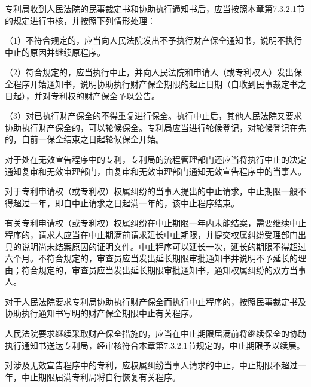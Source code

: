 专利局收到人民法院的民事裁定书和协助执行通知书后，应当按照本章第7.3.2.1节的规定进行审核，并按照下列情形处理：

{\setlength{\parindent}{17.1bp}（1）不符合规定的，应当向人民法院发出不予执行财产保全通知书，说明不执行中止的原因并继续原程序。\par}

{\setlength{\parindent}{17.1bp}（2）符合规定的，应当执行中止，并向人民法院和申请人（或专利权人）发出保全程序开始通知书，说明协助执行财产保全期限的起止日期（自收到民事裁定书之日起），并对专利权的财产保全予以公告。\par}

{\setlength{\parindent}{17.1bp}（3）对已执行财产保全的不得重复进行保全。执行中止后，其他人民法院又要求协助执行财产保全的，可以轮候保全。专利局应当进行轮候登记，对轮候登记在先的，自前一保全结束之日起轮候保全开始。\par}

对于处在无效宣告程序中的专利，专利局的流程管理部门还应当将执行中止的决定通知复审和无效审理部门，由复审和无效审理部门通知无效宣告程序中的当事人。

对于专利申请权（或专利权）权属纠纷的当事人提出的中止请求，中止期限一般不得超过一年，即自中止请求之日起满一年的，该中止程序结束。

有关专利申请权（或专利权）权属纠纷在中止期限一年内未能结案，需要继续中止程序的，请求人应当在中止期满前请求延长中止期限，并提交权属纠纷受理部门出具的说明尚未结案原因的证明文件。中止程序可以延长一次，延长的期限不得超过六个月。不符合规定的，审查员应当发出延长期限审批通知书并说明不予延长的理由；符合规定的，审查员应当发出延长期限审批通知书，通知权属纠纷的双方当事人。

对于人民法院要求专利局协助执行财产保全而执行中止程序的，按照民事裁定书及协助执行通知书写明的财产保全期限中止有关程序。

人民法院要求继续采取财产保全措施的，应当在中止期限届满前将继续保全的协助执行通知书送达专利局，经审核符合本章第7.3.2.1节规定的，中止期限予以续展。

对涉及无效宣告程序中的专利，应权属纠纷当事人请求的中止，中止期限不超过一年，中止期限届满专利局将自行恢复有关程序。

